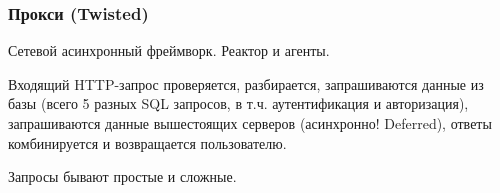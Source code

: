 \begin{frame}
  \frametitle{Прокси (Twisted)}

  Сетевой асинхронный фреймворк.  Реактор и агенты.

  Входящий HTTP-запрос проверяется, разбирается, запрашиваются данные
  из базы (всего 5 разных SQL запросов, в т.ч. аутентификация и
  авторизация), запрашиваются данные вышестоящих серверов (асинхронно!
  Deferred), ответы комбинируется и возвращается пользователю.

  Запросы бывают простые и сложные.
\end{frame}

